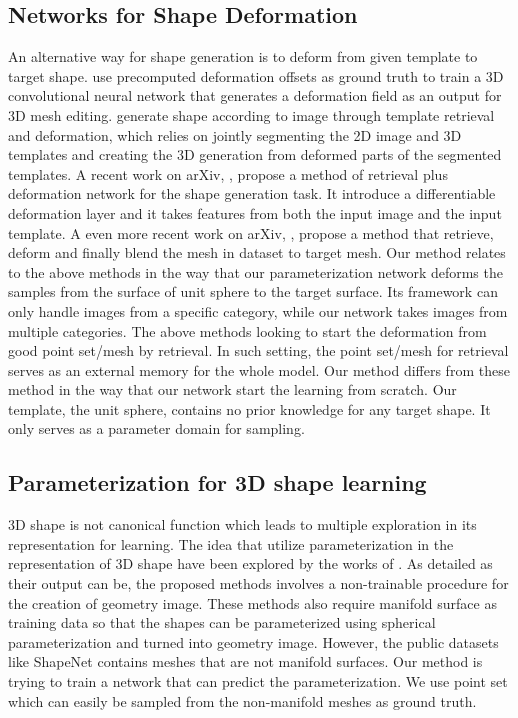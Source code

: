 \subsection{Networks for Shape Deformation}
An alternative way for shape generation is to deform from given template to target shape. \citep{deformflow} use precomputed deformation offsets as ground truth to train a 3D convolutional neural network that generates a deformation field as an output for 3D mesh editing. \citep{Huang:2015:SRV:2809654.2766890} generate shape according to image through template retrieval and
deformation, which relies on jointly segmenting the 2D image and 3D templates and creating the
3D generation from deformed parts of the segmented templates. A recent work on arXiv, \citep{deformnet}, propose a method of retrieval plus deformation network for the shape generation task. It introduce a differentiable deformation layer and it takes features from both the input image and the input template.
A even more recent work on arXiv, \citep{img2mesh}, propose a method that retrieve, deform and finally blend the mesh in dataset to target mesh. 
Our method relates to the above methods in the way that our parameterization network deforms the samples from the surface of unit sphere to the target surface. Its framework can only handle images from a specific category, while our network takes images from multiple categories.  
The above methods looking to start the deformation from good point set/mesh by retrieval. In such setting, the point set/mesh for retrieval serves as an external memory for the whole model. 
Our method differs from these method in the way that our network start the learning from scratch. Our template, the unit sphere, contains no prior knowledge for any target shape. It only serves as a parameter domain for sampling.
  
\subsection{Parameterization for 3D shape learning}
3D shape is not canonical function which leads to multiple exploration in its representation for learning. The idea that utilize parameterization in the representation of 3D shape have been explored by the works of \citep{surfnet,geoimg}. As detailed as their output can be, the proposed methods involves a non-trainable procedure for the creation of geometry image. These methods also require manifold surface as training data so that the shapes can be parameterized using spherical parameterization and turned into geometry image. However, the public datasets like ShapeNet\citep{shapenetdata} contains meshes that are not manifold surfaces. Our method is trying to train a network that can predict the parameterization. We use point set which can easily be sampled from the non-manifold meshes as ground truth. 
